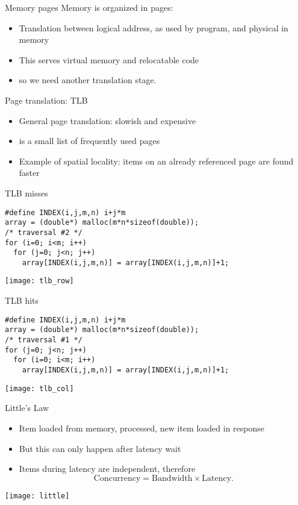 \begin{numberedframe}{Memory pages}
  Memory is organized in pages:
  \begin{itemize}
  \item Translation between logical address, as used by program,
    and physical in memory
  \item This serves virtual memory and relocatable code
  \item so we need another translation stage.
  \end{itemize}
\end{numberedframe}

\begin{numberedframe}{Page translation: TLB}
  \begin{itemize}
  \item General page translation: slowish and expensive
  \item {} is a small list of frequently used pages
  \item Example of spatial locality: items on an already referenced page
    are found faster
  \end{itemize}
\end{numberedframe}

\begin{numberedframe}{TLB misses}
\small
\begin{verbatim}
#define INDEX(i,j,m,n) i+j*m
array = (double*) malloc(m*n*sizeof(double));
/* traversal #2 */
for (i=0; i<m; i++)
  for (j=0; j<n; j++)
    array[INDEX(i,j,m,n)] = array[INDEX(i,j,m,n)]+1;
\end{verbatim}
  \texttt{[image: tlb\_row]}
\end{numberedframe}

\begin{numberedframe}{TLB hits}
\small
\begin{verbatim}
#define INDEX(i,j,m,n) i+j*m
array = (double*) malloc(m*n*sizeof(double));
/* traversal #1 */
for (j=0; j<n; j++)
  for (i=0; i<m; i++)
    array[INDEX(i,j,m,n)] = array[INDEX(i,j,m,n)]+1;
\end{verbatim}
  \texttt{[image: tlb\_col]}
\end{numberedframe}

\begin{numberedframe}{Little's Law}
  \begin{itemize}
  \item Item loaded from memory, processed, new item loaded in response
  \item But this can only happen after latency wait
  \item Items during latency are independent, therefore
    \[ \mathrm{Concurrency}=\mathrm{Bandwidth}\times \mathrm{Latency}. \]
  \end{itemize}
  \texttt{[image: little]}
\end{numberedframe}

